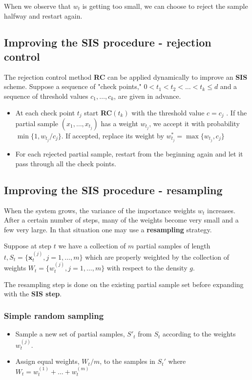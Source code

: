 \documentclass[times, utf8, diplomski]{fer}
\begin{document}
When we observe that $w_t$ is getting too small, we can choose to reject the sample halfway and restart again.


\subsection{Improving the SIS procedure - rejection control}
\label{SIS_RC}
The rejection control method \textbf{RC} can be applied dynamically to improve an \textbf{SIS} scheme. Suppose a sequence of "check points," $0 < t_1 < t_2 < \ldots < t_k \leq d$ and a sequence of threshold values $c_1, \ldots, c_k$, are given in advance. 
\begin{itemize}
\item{At each check point $t_j$ start \textbf{RC}$(t_k)$ with the threshold value $c = c_j$ . If the partial sample $(x_1, \ldots, x_{t_j})$ has a weight $w_{t_j}$, we accept it with probability $\min \{ 1, w_{t_j}/c_j \}$. If accepted, replace its weight by $w^{*}_{t_j} = \max \{ w_{t_j}, c_j \}$}
\item{For each rejected partial sample, restart from the beginning again and let it pass through all the check points.}
\end{itemize}

\subsection{Improving the SIS procedure - resampling}
When the system grows, the variance of the importance weights $w_t$ increases. After a certain number of steps, many of the weights become very small and a few very large. In that situation one may use a \textbf{resampling} strategy. 

Suppose at step $t$ we have a collection of $m$ partial samples of length $t, S_t = \{ \mathbf{x}_{t}^{(j)}, j = 1, \ldots, m \}$ which are properly weighted by the collection of weights $W_t = \{w_t^{(j)}, j = 1, \ldots, m\}$ with respect to the density $g$.

The resampling step is done on the existing partial sample set before expanding with the \textbf{SIS step}.

\subsubsection{Simple random sampling}
\begin{itemize}
\item{Sample a new set of partial samples, $S'_t$ from $S_t$ according to the weights $w_t^{(j)}$.}
\item{Assign equal weights, $W_t / m$, to the samples in $S_t'$ where $W_t = w_t^{(1)} + \ldots + w_t^{(m)}$}
\end{itemize}
\end{document}

